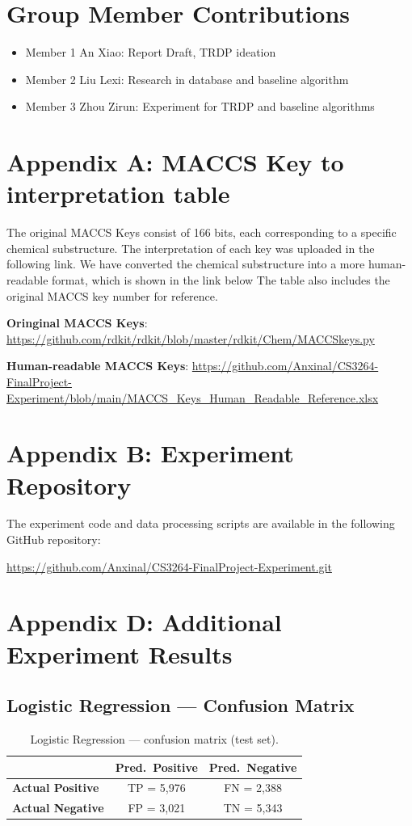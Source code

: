 \documentclass[letterpaper]{article} %
\begin{document}



\section{Group Member Contributions}
\begin{itemize}
    \item Member 1 An Xiao: Report Draft, TRDP ideation
    \item Member 2 Liu Lexi: Research in database and baseline algorithm
    \item Member 3 Zhou Zirun: Experiment for TRDP and baseline algorithms
\end{itemize}

\section{Appendix A: MACCS Key to interpretation table}
The original MACCS Keys consist of 166 bits, each corresponding to a specific chemical substructure. The interpretation of each key was uploaded in the following link. We have converted the chemical substructure into a more human-readable format, which is shown in the link below The table also includes the original MACCS key number for reference.

\textbf{Oringinal MACCS Keys}: \url{https://github.com/rdkit/rdkit/blob/master/rdkit/Chem/MACCSkeys.py}

\textbf{Human-readable MACCS Keys}: \url{https://github.com/Anxinal/CS3264-FinalProject-Experiment/blob/main/MACCS_Keys_Human_Readable_Reference.xlsx}

\section{Appendix B: Experiment Repository}
The experiment code and data processing scripts are available in the following GitHub repository: 

\url{https://github.com/Anxinal/CS3264-FinalProject-Experiment.git}


\section{Appendix D: Additional Experiment Results}
\label{sec:appendix_d}

\subsection*{Logistic Regression --- Confusion Matrix}
\begin{table}[h]
\centering
\caption{Logistic Regression --- confusion matrix (test set).}
\label{tab:lr_cm}
\begin{tabular}{lcc}
\toprule
 & \textbf{Pred.\ Positive} & \textbf{Pred.\ Negative} \\
\midrule
\textbf{Actual Positive} & TP = 5,976 & FN = 2,388 \\
\textbf{Actual Negative} & FP = 3,021 & TN = 5,343 \\
\bottomrule
\end{tabular}
\end{table}
\end{document}
